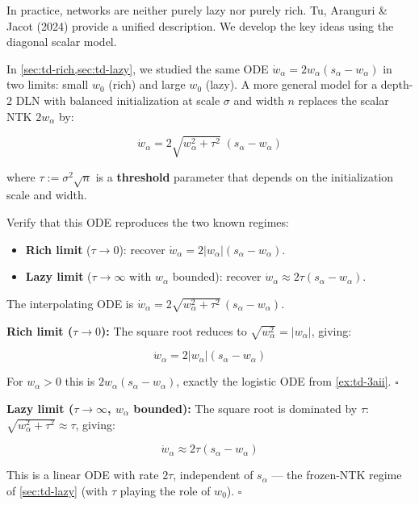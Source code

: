 \documentclass[11pt]{article}
\providecommand{\tightlist}{%
  \setlength{\itemsep}{0pt}\setlength{\parskip}{0pt}}
\begin{document}
In practice, networks are neither purely lazy nor purely rich. Tu,
Aranguri \& Jacot (2024) provide a unified description. We develop the
key ideas using the diagonal scalar model.

\begin{exercise}
\label{ex:td-5a}
In \cref{sec:td-rich,sec:td-lazy}, we
studied the same ODE \(\dot{w}_\alpha = 2w_\alpha(s_\alpha - w_\alpha)\)
in two limits: small \(w_0\) (rich) and large \(w_0\) (lazy). A more
general model for a depth-2 DLN with balanced initialization at scale
\(\sigma\) and width \(n\) replaces the scalar NTK \(2w_\alpha\) by:

\[\dot{w}_\alpha = 2\sqrt{w_\alpha^2 + \tau^2}\;(s_\alpha - w_\alpha)\]

where \(\tau := \sigma^2 \sqrt{n}\) is a \textbf{threshold} parameter
that depends on the initialization scale and width.

Verify that this ODE reproduces the two known regimes:

\begin{itemize}
\tightlist
\item
  \textbf{Rich limit} (\(\tau \to 0\)): recover
  \(\dot{w}_\alpha = 2|w_\alpha|(s_\alpha - w_\alpha)\).
\item
  \textbf{Lazy limit} (\(\tau \to \infty\) with \(w_\alpha\) bounded):
  recover \(\dot{w}_\alpha \approx 2\tau(s_\alpha - w_\alpha)\).
\end{itemize}
\end{exercise}

\begin{solution}[ex:td-5a]
The interpolating ODE is
\(\dot{w}_\alpha = 2\sqrt{w_\alpha^2 + \tau^2}\,(s_\alpha - w_\alpha)\).

\textbf{Rich limit (\(\tau \to 0\)):} The square root reduces to
\(\sqrt{w_\alpha^2} = |w_\alpha|\), giving:

\[\dot{w}_\alpha = 2|w_\alpha|(s_\alpha - w_\alpha)\]

For \(w_\alpha > 0\) this is \(2w_\alpha(s_\alpha - w_\alpha)\), exactly
the logistic ODE from \cref{ex:td-3aii}. \(\square\)

\textbf{Lazy limit (\(\tau \to \infty\), \(w_\alpha\) bounded):} The
square root is dominated by \(\tau\):
\(\sqrt{w_\alpha^2 + \tau^2} \approx \tau\), giving:

\[\dot{w}_\alpha \approx 2\tau(s_\alpha - w_\alpha)\]

This is a linear ODE with rate \(2\tau\), independent of \(s_\alpha\)
--- the frozen-NTK regime of \cref{sec:td-lazy} (with \(\tau\) playing the role
of \(w_0\)). \(\square\)
\end{solution}
\end{document}
